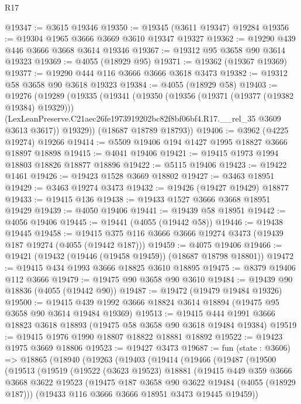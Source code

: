 \begin{lexlean}{R17}
\begin{coremodule}
@19347 := @3615 @19346
@19350 := @19345 (@3611 @19347) @19284
@19356 := @19304 @1965 @3666 @3669 @3610 @19347 @19327
@19362 := @19290 @439 @446 @3666 @3668 @3614 @19346
@19367 := @19312 @95 @3658 @90 @3614 @19323
@19369 := @4055 (@18929 @95)
@19371 := @19362 (@19367 @19369)
@19377 := @19290 @444 @116 @3666 @3666 @3618 @3473
@19382 := @19312 @58 @3658 @90 @3618 @19323
@19384 := @4055 (@18929 @58)
@19403 := @19276
    (@19289
      (@19335
        (@19341
          (@19350
            (@19356 (@19371 (@19377 (@19382 @19384) @19329)))
            (LexLeanPreserve.C21aec26fe1973919202bc82f8bf06bf4.R17.__rel_35 @3609 @3613 @3617))
          @19329))
      (@18687 @18789 @18793))
@19406 := @3962 (@4225 @19274) @19266
@19414 := @5509 @19406 @194 @1427 @1995 @18827 @3666 @18897 @18898
@19415 := @4041 @19406
@19421 := @19415 @1973 @1994 @18803 @18826 @18877 @18896
@19422 := @5115 @19406
@19423 := @19422 @1461
@19426 := @19423 @1528 @3669 @18802
@19427 := @3463 @18951
@19429 := @3463 @19274 @3473
@19432 := @19426 (@19427 @19429) @18877
@19433 := @19415 @136
@19438 := @19433 @1527 @3666 @3668 @18951 @19429
@19439 := @4050 @19406
@19441 := @19439 @58 @18951
@19442 := @4056 @19406
@19445 := @19441 (@4055 (@19442 @58))
@19446 := @19438 @19445
@19458 := @19415 @375 @116 @3666 @3666 @19274 @3473 (@19439 @187 @19274 (@4055 (@19442 @187)))
@19459 := @4075 @19406
@19466 := @19421 (@19432 (@19446 (@19458 @19459)) (@18687 @18798 @18801))
@19472 := @19415 @434 @1993 @3666 @18825 @3610 @18895
@19475 := @8379 @19406 @112 @3666
@19479 := @19475 @90 @3658 @90 @3610
@19484 := @19439 @90 @18836 (@4055 (@19442 @90))
@19487 := @19472 (@19479 @19484 @19326)
@19500 := @19415 @439 @1992 @3666 @18824 @3614 @18894 (@19475 @95 @3658 @90 @3614 @19484 @19369)
@19513 := @19415 @444 @1991 @3666 @18823 @3618 @18893 (@19475 @58 @3658 @90 @3618 @19484 @19384)
@19519 := @19415 @1976 @1990 @18807 @18822 @18881 @18892
@19522 := @19423 @1975 @3669 @18806
@19523 := @19427 @3473
@19687 := fun (state : @3606) =>
  @18865
    (@18940
      (@19263
        (@19403
          (@19414
            (@19466
              (@19487
                (@19500
                  (@19513
                    (@19519
                      (@19522
                        (@3623 @19523)
                        @18881
                        (@19415
                          @449
                          @359
                          @3666
                          @3668
                          @3622
                          @19523
                          (@19475 @187 @3658 @90 @3622 @19484 (@4055 (@18929 @187)))
                          (@19433 @116 @3666 @3666 @18951 @3473 @19445 @19459))

\end{coremodule}
\end{lexlean}
